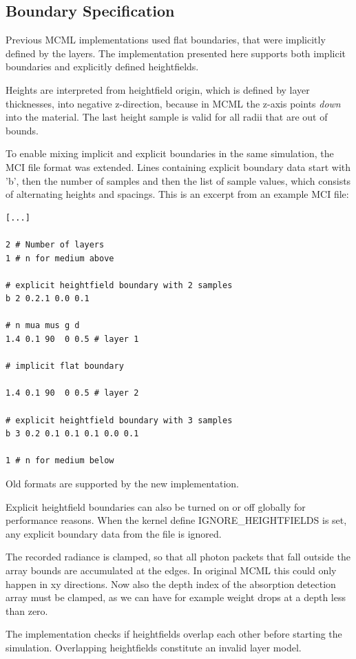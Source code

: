 \documentclass[]{article}
\begin{document}
\subsection{Boundary Specification}

Previous MCML implementations used flat boundaries, that were implicitly defined by the layers. The implementation presented here supports both implicit boundaries and explicitly defined heightfields.

Heights are interpreted from heightfield origin, which is defined by layer thicknesses, into negative z-direction, because in MCML the z-axis points \emph{down} into the material. The last height sample is valid for all radii that are out of bounds.

To enable mixing implicit and explicit boundaries in the same simulation, the MCI file format was extended. Lines containing explicit boundary data start with 'b', then the number of samples and then the list of sample values, which consists of alternating heights and spacings. This is an excerpt from an example MCI file:

\begin{lstlisting}
[...]

2 # Number of layers
1 # n for medium above

# explicit heightfield boundary with 2 samples
b 2 0.2.1 0.0 0.1

# n mua mus g d
1.4 0.1 90  0 0.5 # layer 1

# implicit flat boundary

1.4 0.1 90  0 0.5 # layer 2

# explicit heightfield boundary with 3 samples
b 3 0.2 0.1 0.1 0.1 0.0 0.1

1 # n for medium below
\end{lstlisting}

Old formats are supported by the new implementation.

Explicit heightfield boundaries can also be turned on or off globally for performance reasons. When the kernel define IGNORE\_HEIGHTFIELDS is set, any explicit boundary data from the file is ignored.

The recorded radiance is clamped, so that all photon packets that fall outside the array bounds are accumulated at the edges. In original MCML this could only happen in xy directions. Now also the depth index of the absorption detection array must be clamped, as we can have for example weight drops at a depth less than zero.

The implementation checks if heightfields overlap each other before starting the simulation. Overlapping heightfields constitute an invalid layer model.
\end{document}
